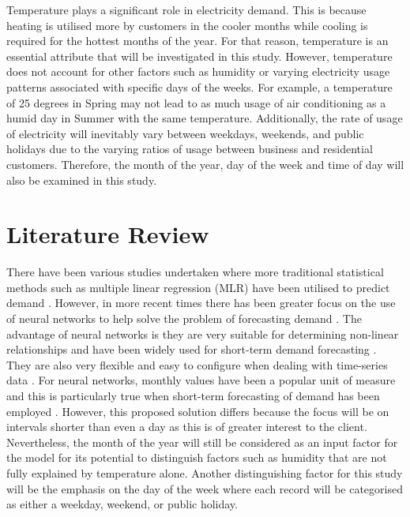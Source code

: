 \documentclass[mstat,12pt]{unswthesis}
\begin{document}
\bigskip

Temperature plays a significant role in electricity demand. This is
because heating is utilised more by customers in the cooler months while
cooling is required for the hottest months of the year. For that reason,
temperature is an essential attribute that will be investigated in this
study. However, temperature does not account for other factors such as
humidity or varying electricity usage patterns associated with specific
days of the weeks. For example, a temperature of 25 degrees in Spring
may not lead to as much usage of air conditioning as a humid day in
Summer with the same temperature. Additionally, the rate of usage of
electricity will inevitably vary between weekdays, weekends, and public
holidays due to the varying ratios of usage between business and
residential customers. Therefore, the month of the year, day of the week
and time of day will also be examined in this study.

\hypertarget{literature-review}{%
\chapter{Literature Review}\label{literature-review}}

There have been various studies undertaken where more traditional
statistical methods such as multiple linear regression (MLR) have been
utilised to predict demand \cite{Mohamed2005}. However, in more recent
times there has been greater focus on the use of neural networks to help
solve the problem of forecasting demand \cite{Gonzalez2008}. The
advantage of neural networks is they are very suitable for determining
non-linear relationships \cite{Gonzalez2008} and have been widely used
for short-term demand forecasting \cite{Ciulla2019}. They are also very
flexible and easy to configure when dealing with time-series data
\cite{Carmona2002}. For neural networks, monthly values have been a
popular unit of measure and this is particularly true when short-term
forecasting of demand has been employed \cite{Carmona2002}. However,
this proposed solution differs because the focus will be on intervals
shorter than even a day as this is of greater interest to the client.
Nevertheless, the month of the year will still be considered as an input
factor for the model for its potential to distinguish factors such as
humidity that are not fully explained by temperature alone. Another
distinguishing factor for this study will be the emphasis on the day of
the week where each record will be categorised as either a weekday,
weekend, or public holiday.
\end{document}
